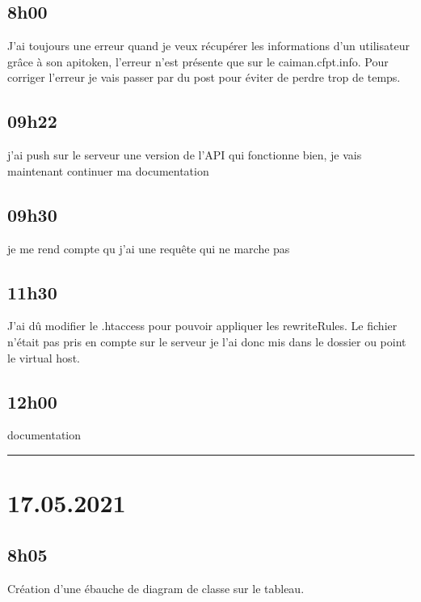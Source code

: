 \documentclass[a4paper,12pt,french]{sphinxmanual}
\begin{document}
\subsection{8h00}
\label{\detokenize{logbook:id114}}
\sphinxAtStartPar
J’ai toujours une erreur quand je veux récupérer les informations d’un utilisateur grâce à son apitoken, l’erreur n’est présente que sur le caiman.cfpt.info.
Pour corriger l’erreur je vais passer par du post pour éviter de perdre trop de temps.


\subsection{09h22}
\label{\detokenize{logbook:h22}}
\sphinxAtStartPar
j’ai push sur le serveur une version de l’API qui fonctionne bien, je vais maintenant continuer ma documentation


\subsection{09h30}
\label{\detokenize{logbook:id115}}
\sphinxAtStartPar
je me rend compte qu j’ai une requête qui ne marche pas


\subsection{11h30}
\label{\detokenize{logbook:id116}}
\sphinxAtStartPar
J’ai dû modifier le .htaccess pour pouvoir appliquer les rewriteRules. Le fichier n’était pas pris en compte sur le serveur je l’ai donc mis dans le dossier ou point le virtual host.


\subsection{12h00}
\label{\detokenize{logbook:id117}}
\sphinxAtStartPar
documentation


\bigskip\hrule\bigskip



\section{17.05.2021}
\label{\detokenize{logbook:id118}}

\subsection{8h05}
\label{\detokenize{logbook:id119}}
\sphinxAtStartPar
Création d’une ébauche de diagram de classe sur le tableau.
\end{document}
